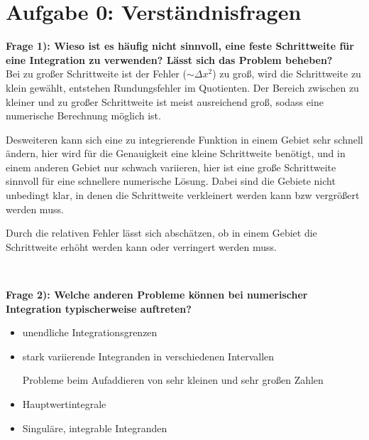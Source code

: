 \section*{Aufgabe 0: Verständnisfragen}

\textbf{Frage 1): Wieso ist es häufig nicht sinnvoll, eine feste Schrittweite für eine Integration zu verwenden?
Lässt sich das Problem beheben?}\\

Bei zu großer Schrittweite ist der Fehler ($\sim \Delta x^2$) zu groß,
wird die Schrittweite zu klein gewählt, entstehen Rundungsfehler im Quotienten.
Der Bereich zwischen zu kleiner und zu großer Schrittweite ist meist ausreichend
groß, sodass eine numerische Berechnung möglich ist.

Desweiteren kann sich eine zu integrierende Funktion in einem Gebiet sehr schnell ändern, hier
wird für die Genauigkeit eine kleine Schrittweite benötigt, und in einem anderen
Gebiet nur schwach variieren, hier ist eine große Schrittweite sinnvoll für
eine schnellere numerische Lösung.
Dabei sind die Gebiete nicht unbedingt klar, in denen die Schrittweite
verkleinert werden kann bzw vergrößert werden muss.

Durch die relativen Fehler lässt sich abschätzen, ob in einem Gebiet die
Schrittweite erhöht werden kann oder verringert werden muss.

\noindent \,


\textbf{Frage 2): Welche anderen Probleme können bei numerischer Integration typischerweise auftreten?}\\


\begin{itemize}
  \item unendliche Integrationsgrenzen
  \item stark variierende Integranden in verschiedenen Intervallen

  \rightarrow Probleme beim Aufaddieren von sehr kleinen und sehr großen Zahlen
  \item Hauptwertintegrale
  \item Singuläre, integrable Integranden

\end{itemize}

